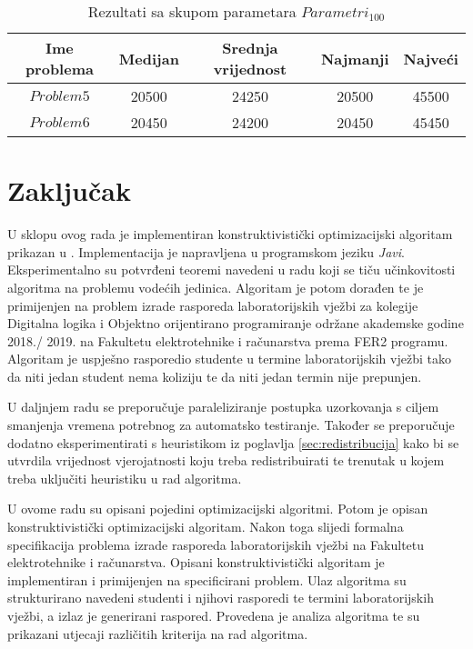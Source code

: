 \documentclass[times, utf8, zavrsni]{fer}
\begin{document}
\begin{table}
  \caption{Rezultati sa skupom parametara $Parametri_{100}$}
  \label{tbl:oop_100}
  \centering
  \begin{tabular}{c | c | c | c | c   }
    Ime problema &  Medijan & Srednja vrijednost & Najmanji & Najveći \\ \hline
    $Problem5$ & 20500 & 24250 & 20500 & 45500 \\ \hline
    $Problem6$ & 20450 & 24200 & 20450 & 45450
  \end{tabular}
\end{table}


\chapter{Zaključak}
U sklopu ovog rada je implementiran konstruktivistički optimizacijski algoritam prikazan u \cite{DBLP:journals/tec/WuK14}. Implementacija je napravljena u
programskom jeziku \textit{Javi}. Eksperimentalno su potvrđeni teoremi navedeni u radu \cite{DBLP:journals/tec/WuK14} koji se tiču učinkovitosti algoritma
na problemu vodećih jedinica. Algoritam je potom dorađen te je primijenjen na problem izrade rasporeda laboratorijskih vježbi za kolegije Digitalna logika i
Objektno orijentirano programiranje održane akademske godine 2018./ 2019. na Fakultetu elektrotehnike i računarstva prema FER2 programu. Algoritam je uspješno
rasporedio studente u termine laboratorijskih vježbi tako da niti jedan student nema koliziju te da niti jedan termin nije prepunjen.

U daljnjem radu se preporučuje paraleliziranje postupka uzorkovanja s ciljem smanjenja vremena potrebnog za automatsko testiranje. Također se preporučuje dodatno
eksperimentirati s heuristikom iz poglavlja \ref{sec:redistribucija} kako bi se utvrdila vrijednost vjerojatnosti koju treba redistribuirati te trenutak
u kojem treba uključiti heuristiku u rad algoritma.








\begin{sazetak}
U ovome radu su opisani pojedini optimizacijski algoritmi.
Potom je opisan konstruktivistički optimizacijski algoritam.
Nakon toga slijedi formalna specifikacija problema izrade rasporeda laboratorijskih vježbi na Fakultetu elektrotehnike i računarstva. Opisani
konstruktivistički algoritam je implementiran i primijenjen na specificirani problem. Ulaz algoritma su strukturirano navedeni studenti i njihovi rasporedi te
termini laboratorijskih vježbi, a izlaz je generirani raspored.
 Provedena je analiza algoritma te su prikazani utjecaji različitih
kriterija na rad algoritma.

\end{sazetak}
\end{document}
